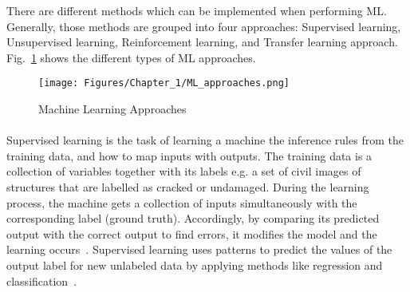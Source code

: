 There are different methods which can be implemented when performing ML. 
Generally, those methods are grouped into four approaches: Supervised learning, Unsupervised learning, Reinforcement learning, and Transfer learning approach.
Fig.~\ref{fig:Machine_learning_approaches} shows the different types of ML approaches.
\begin{figure} [!ht]
	\begin{center}
		\centering
		\texttt{[image: Figures/Chapter\_1/ML\_approaches.png]}
	\end{center}
	\caption{Machine Learning Approaches} 
	\label{fig:Machine_learning_approaches}
\end{figure}
\paragraph{}
Supervised learning is the task of learning a machine the inference rules from the training data, and how to map inputs with outputs.
The training data is a collection of variables together with its labels e.g. a set of civil images of structures that are labelled as cracked or undamaged.
During the learning process, the machine gets a collection of inputs simultaneously with the corresponding label (ground truth).
Accordingly, by comparing its predicted output with the correct output to find errors, it modifies the model and the learning occurs~\cite{Ongsulee2018}. 
Supervised learning uses patterns to predict the values of the output label  for new unlabeled data by applying methods like regression and classification~\cite{Ongsulee2018}. 

